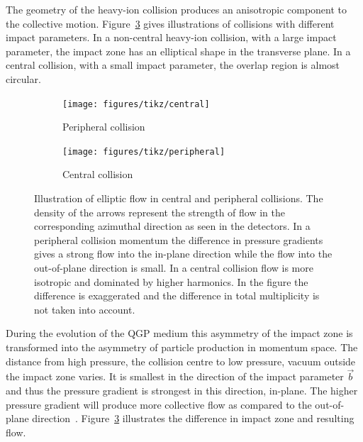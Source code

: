 
The geometry of the heavy-ion collision produces an anisotropic component to the collective motion. Figure~\ref{fig:flow} gives illustrations of collisions with different impact parameters. In a non-central heavy-ion collision, with a large impact parameter, the impact zone has an elliptical shape in the transverse plane. In a central collision, with a small impact parameter, the overlap region is almost circular.

\begin{figure}[b!]
\centering
        \begin{subfigure}[b]{0.52\textwidth}
                \centering
	         \texttt{[image: figures/tikz/central]}

                \caption{Peripheral collision}
                \label{fig:InteractionB}
        \end{subfigure}
        \begin{subfigure}[b]{0.45\textwidth}
                \centering
                \texttt{[image: figures/tikz/peripheral]}

                \caption{Central collision}
                \label{fig:InteractionA}
        \end{subfigure}
	\caption[Illustration of flow in momentum space in central and peripheral collisions.]{Illustration of elliptic flow in central and peripheral collisions. The density of the arrows represent the strength of flow in the corresponding azimuthal direction as seen in the detectors. In a peripheral collision momentum the difference in pressure gradients gives a strong flow into the in-plane direction while the flow into the out-of-plane direction is small. In a central collision flow is more isotropic and dominated by higher harmonics. In the figure the difference is exaggerated and the difference in total multiplicity is not taken into account.}
	\label{fig:flow}
\end{figure}

During the evolution of the QGP medium this asymmetry of the impact zone is transformed into the asymmetry of particle production in momentum space. The distance from high pressure, the collision centre to low pressure, vacuum outside the impact zone varies. It is smallest in the direction of the impact parameter $\vec b$ and thus the pressure gradient is strongest in this direction, in-plane. The higher pressure gradient will produce more collective flow as compared to the out-of-plane direction~\cite{Ollitrault:1992,Ollitrault:1993, Heinz:2002}. Figure~\ref{fig:flow} illustrates the difference in impact zone and resulting flow.


